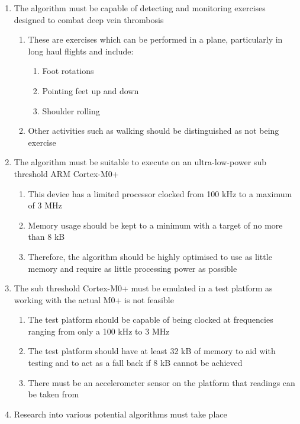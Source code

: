 
\begin{enumerate}
  \item The algorithm must be capable of detecting and monitoring exercises designed to combat deep vein thrombosis
  \begin{enumerate}[label*=\arabic*.]
    \item These are exercises which can be performed in a plane, particularly in long haul flights and include:
    \begin{enumerate}[label*=\arabic*.]
      \item Foot rotations
      \item Pointing feet up and down
      \item Shoulder rolling
    \end{enumerate}
    \item Other activities such as walking should be distinguished as not being exercise
  \end{enumerate}
  \item The algorithm must be suitable to execute on an ultra-low-power sub threshold ARM Cortex-M0+
  \begin{enumerate}[label*=\arabic*.]
    \item This device has a limited processor clocked from 100 kHz to a maximum of 3 MHz
    \item Memory usage should be kept to a minimum with a target of no more than 8 kB
    \item Therefore, the algorithm should be highly optimised to use as little memory and require as little processing power as possible
  \end{enumerate}
  \item The sub threshold Cortex-M0+ must be emulated in a test platform as working with the actual M0+ is not feasible
  \begin{enumerate}[label*=\arabic*.]
    \item The test platform should be capable of being clocked at frequencies ranging from only a 100 kHz to 3 MHz
    \item The test platform should have at least 32 kB of memory to aid with testing and to act as a fall back if 8 kB cannot be achieved
    \item There must be an accelerometer sensor on the platform that readings can be taken from
  \end{enumerate}
  \item Research into various potential algorithms must take place

\end{enumerate}
